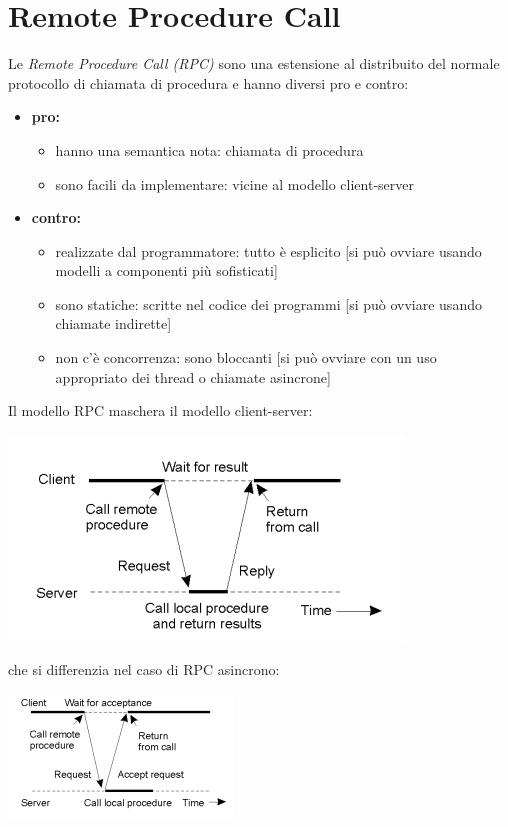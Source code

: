 \documentclass[a4paper,12pt, oneside]{book}
\begin{document}
\chapter{Remote Procedure Call}
Le \textit{Remote Procedure Call (RPC)} sono una estensione al distribuito del normale
protocollo di chiamata di procedura e hanno diversi pro e contro:
\begin{itemize}
\item \textbf{pro:}
  \begin{itemize}
    \item hanno una semantica nota: chiamata di procedura
    \item sono facili da implementare: vicine al modello client-server
  \end{itemize}
\item \textbf{contro:}
  \begin{itemize}
    \item realizzate dal programmatore: tutto è esplicito
      [si può ovviare usando modelli a componenti più sofisticati]
    \item sono statiche: scritte nel codice dei programmi
      [si può ovviare usando chiamate indirette]
    \item non c’è concorrenza: sono bloccanti
      [si può ovviare con un uso appropriato dei thread o chiamate asincrone]
  \end{itemize}
\end{itemize}
Il modello RPC maschera il modello client-server:
\begin{center}
\includegraphics[scale=o.7]{img/rpc.png}
\end{center}
che si differenzia nel caso di RPC asincrono:
\begin{center}
\includegraphics[scale=0.7]{img/rpc2.png}
\end{center}
\end{document}
